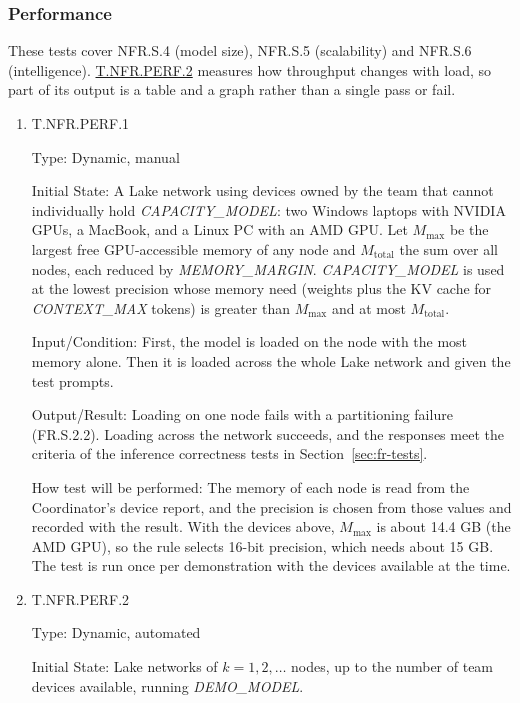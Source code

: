 \documentclass[12pt, titlepage]{article}
\begin{document}
\subsubsection{Performance}

These tests cover NFR.S.4 (model size), NFR.S.5 (scalability) and NFR.S.6
(intelligence). \hyperref[T.NFR.PERF.2]{T.NFR.PERF.2} measures how throughput changes with load, so
part of its output is a table and a graph rather than a single pass or fail.

\begin{enumerate}

\item{T.NFR.PERF.1\\}
\label{T.NFR.PERF.1}

Type: Dynamic, manual

Initial State: A Lake network using devices owned by the team that cannot
individually hold \textit{CAPACITY\_MODEL}: two Windows laptops with NVIDIA
GPUs, a MacBook, and a Linux PC with an AMD GPU. Let $M_{\max}$ be the largest
free GPU-accessible memory of any
node and $M_{\mathrm{total}}$ the sum over all nodes, each reduced by
\textit{MEMORY\_MARGIN}. \textit{CAPACITY\_MODEL} is used at the lowest
precision whose memory need (weights plus the KV cache for
\textit{CONTEXT\_MAX} tokens) is greater than $M_{\max}$ and at most
$M_{\mathrm{total}}$.

Input/Condition: First, the model is loaded on the node with the most memory
alone. Then it is loaded across the whole Lake network and given the test
prompts.

Output/Result: Loading on one node fails with a partitioning failure
(FR.S.2.2). Loading across the network succeeds, and the responses meet the
criteria of the inference correctness tests in Section~\ref{sec:fr-tests}.

How test will be performed: The memory of each node is read from the
Coordinator's device report, and the precision is chosen from those values and
recorded with the result. With the devices above, $M_{\max}$ is about 14.4 GB
(the AMD GPU), so the rule selects 16-bit precision, which needs about 15 GB.
The test is run once per demonstration with the devices available at the time.

\item{T.NFR.PERF.2\\}
\label{T.NFR.PERF.2}

Type: Dynamic, automated

Initial State: Lake networks of $k = 1, 2, \ldots$ nodes, up to the number of
team devices available, running \textit{DEMO\_MODEL}.


\end{enumerate}
\end{document}
